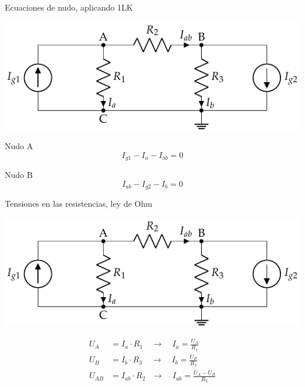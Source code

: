 \documentclass[aspectratio=169, xcolor={usenames,svgnames,dvipsnames}]{beamer}
\begin{document}
\begin{frame}{Ecuaciones de nudo, \hspace{3mm}aplicando 1LK}
    \begin{center}
    \includegraphics[width=.8\linewidth]{../figs/nudos.pdf}
    \end{center}
    
    Nudo A
    \begin{equation*}
      I_{g1} - I_a - I_{ab} = 0
    \end{equation*}
    
    Nudo B
    \begin{equation*}
      I_{ab} - I_{g2} - I_b = 0
    \end{equation*}
\end{frame}
    

\begin{frame}{Tensiones en las resistencias, \hspace{3mm}ley de Ohm}
    \begin{center}
    \includegraphics[width=.7\linewidth]{../figs/nudos.pdf}
    \end{center}
    \begin{align*}
      U_A &= I_a \cdot R_1 \quad \rightarrow \quad I_a = \frac{U_A}{R_1}\\
      U_B &= I_b \cdot R_3 \quad \rightarrow \quad I_b = \frac{U_B}{R_3}\\
      U_{AB} &= I_{ab} \cdot R_2  \;\;\, \rightarrow \quad I_{ab} = \frac{U_A-U_B}{R_2}
    \end{align*}
\end{frame}

\end{document}
